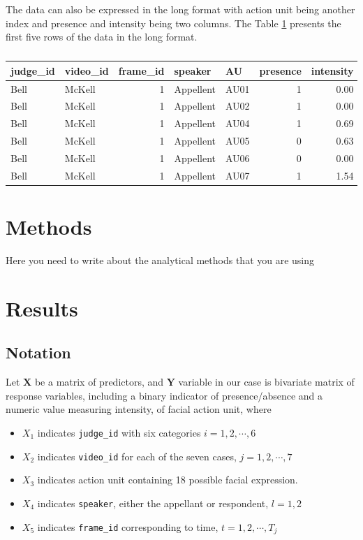 \documentclass{monashthesis}
\begin{document}
The data can also be expressed in the long format with action unit being another index and presence and intensity being two columns. The Table \ref{tab:long} presents the first five rows of the data in the long format.

\begin{table}[t]

\caption{\label{tab:unnamed-chunk-3}\label{tab:long}}
\centering
\begin{tabular}{l|l|r|l|l|r|r}
\hline
judge\_id & video\_id & frame\_id & speaker & AU & presence & intensity\\
\hline
Bell & McKell & 1 & Appellent & AU01 & 1 & 0.00\\
\hline
Bell & McKell & 1 & Appellent & AU02 & 1 & 0.00\\
\hline
Bell & McKell & 1 & Appellent & AU04 & 1 & 0.69\\
\hline
Bell & McKell & 1 & Appellent & AU05 & 0 & 0.63\\
\hline
Bell & McKell & 1 & Appellent & AU06 & 0 & 0.00\\
\hline
Bell & McKell & 1 & Appellent & AU07 & 1 & 1.54\\
\hline
\end{tabular}
\end{table}

\hypertarget{methods}{%
\chapter{Methods}\label{methods}}

Here you need to write about the analytical methods that you are using

\hypertarget{results}{%
\chapter{Results}\label{results}}

\hypertarget{notation}{%
\section{Notation}\label{notation}}

Let \(\mathbf{X}\) be a matrix of predictors, and \(\mathbf{Y}\) variable in our case is bivariate matrix of response variables, including a binary indicator of presence/absence and a numeric value measuring intensity, of facial action unit, where

\begin{itemize}
\tightlist
\item
  \(X_1\) indicates \texttt{judge\_id} with six categories \(i = 1,2, \cdots, 6\)
\item
  \(X_2\) indicates \texttt{video\_id} for each of the seven cases, \(j = 1,2, \cdots, 7\)
\item
  \(X_3\) indicates action unit containing 18 possible facial expression.\\
\item
  \(X_4\) indicates \texttt{speaker}, either the appellant or respondent, \(l=1,2\)
\item
  \(X_5\) indicates \texttt{frame\_id} corresponding to time, \(t = 1,2, \cdots, T_j\)
\end{itemize}
\end{document}
